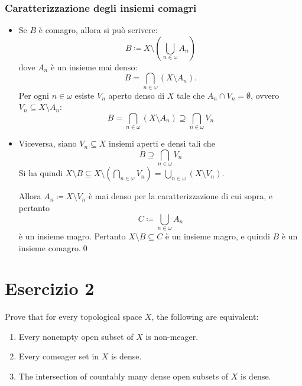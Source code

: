 \documentclass{article}
\newcommand{\1}{\mathds{1}}
\begin{document}
\subsubsection{Caratterizzazione degli insiemi comagri}
\label{sec:org6340613}
\begin{itemize}
\item Se \(B\) è comagro, allora si può scrivere:
\begin{equation*}
B \coloneqq X\setminus \left(\bigcup_{n \in \omega} A_{n}\right)
\end{equation*}
dove \(A_{n}\) è un insieme mai denso:
\begin{equation*}
B = \bigcap_{n \in \omega} (X\setminus A_{n}).
\end{equation*}
Per ogni \(n \in \omega\) esiste \(V_{n}\) aperto denso di \(X\) tale che \(A_{n}\cap V_{n} = \emptyset\), ovvero \(V_{n} \subseteq X\setminus A_{n}\):
\begin{equation*}
  	B= \bigcap_{n \in \omega} (X\setminus A_{n}) \supseteq \bigcap_{n \in \omega} V_{n}
\end{equation*}

\item Viceversa, siano \(V_{n} \subseteq X\) insiemi aperti e densi tali che
\begin{equation*}
  B\supseteq \bigcap_{n \in \omega} V_{n}
\end{equation*}
Si ha quindi \(X\setminus B \subseteq X\setminus \left(\bigcap_{n \in \omega} V_{n}\right) = \bigcup_{n \in \omega} (X\setminus V_{n})\).

Allora \(A_{n} \coloneqq X\setminus V_{n}\) è mai denso per la caratterizzazione di cui sopra, e pertanto
\begin{equation*}
  C\coloneqq \bigcup_{n \in \omega} A_{n}
\end{equation*}
è un insieme magro. Pertanto \(X\setminus B \subseteq C\) è un insieme magro, e quindi \(B\) è un insieme comagro.\qed
\end{itemize}
\section{Esercizio 2}
\label{sec:org4799bf6}

Prove that for every topological space \(X\), the following are equivalent:
\begin{enumerate}
\item Every nonempty open subset of \(X\) is non-meager.
\item Every comeager set in \(X\) is dense.
\item The intersection of countably many dense open subsets of \(X\) is dense.
\end{enumerate}
\end{document}
